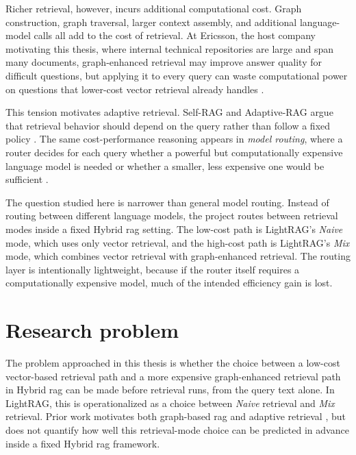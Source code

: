 \documentclass[english, bibtex]{kththesis}               %
\numberwithin{listing}{chapter}
\begin{document}
Richer retrieval, however, incurs additional computational cost. Graph construction, graph traversal, larger context assembly, and additional language-model calls all add to the cost of retrieval. At Ericsson, the host company motivating this thesis, where internal technical repositories are large and span many documents, graph-enhanced retrieval may improve answer quality for difficult questions, but applying it to every query can waste computational power on questions that lower-cost vector retrieval already handles \cite{jeong2024adaptiverag,hu2024routerbench}.

This tension motivates adaptive retrieval. Self-RAG and Adaptive-RAG argue that retrieval behavior should depend on the query rather than follow a fixed policy \cite{jeong2024adaptiverag,asai2023selfrag}. The same cost-performance reasoning appears in \emph{model routing}, where a router decides for each query whether a powerful but computationally expensive language model is needed or whether a smaller, less expensive one would be sufficient \cite{hu2024routerbench}.

The question studied here is narrower than general model routing. Instead of routing between different language models, the project routes between retrieval modes inside a fixed Hybrid \gls{rag} setting. The low-cost path is LightRAG's \emph{Naive} mode, which uses only vector retrieval, and the high-cost path is LightRAG's \emph{Mix} mode, which combines vector retrieval with graph-enhanced retrieval. The routing layer is intentionally lightweight, because if the router itself requires a computationally expensive model, much of the intended efficiency gain is lost.

\section{Research problem}
\label{sec:problem}

The problem approached in this thesis is whether the choice between a low-cost vector-based retrieval path and a more expensive graph-enhanced retrieval path in Hybrid \gls{rag} can be made before retrieval runs, from the query text alone. In LightRAG, this is operationalized as a choice between \emph{Naive} retrieval and \emph{Mix} retrieval. Prior work motivates both graph-based \gls{rag} and adaptive retrieval \cite{edge2024graphrag,lightrag2024,jeong2024adaptiverag,asai2023selfrag}, but does not quantify how well this retrieval-mode choice can be predicted in advance inside a fixed Hybrid \gls{rag} framework.
\end{document}

